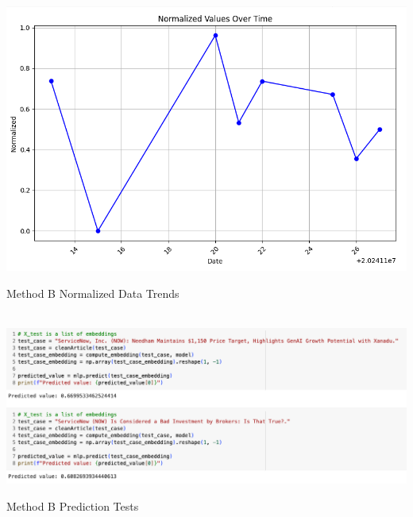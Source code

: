 \documentclass[twocolumn,12pt]{article}
\makeatletter
\newenvironment{figurehere}
  {\def\@captype{figure}}
  {}
\makeatother
\begin{document}
\begin{flushleft}
		\mbox{}\\
		\begin{figurehere}
			\centering
			\includegraphics[width=\linewidth]{images/methbdatanorm.png}
			\caption{Method B Normalized Data Trends}
			\label{fig:methbdatanorm}
		\end{figurehere}
		
		\mbox{}\\
		\begin{figurehere}
			\centering
			\includegraphics[width=\linewidth]{images/methbpred.png}
			\caption{Method B Prediction Tests}
			\label{fig:methbpred}
		\end{figurehere}
		
	

\end{flushleft}
\end{document}

